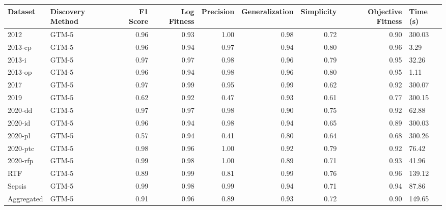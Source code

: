 \begin{tabular}{llrrrrrrl}
\toprule
Dataset & Discovery Method & F1 Score & Log Fitness & Precision & Generalization & Simplicity & Objective Fitness & Time (s) \\
\midrule
2012 & GTM-5 & 0.96 & 0.93 & 1.00 & 0.98 & 0.72 & 0.90 & 300.03 \\
2013-cp & GTM-5 & 0.96 & 0.94 & 0.97 & 0.94 & 0.80 & 0.96 & 3.29 \\
2013-i & GTM-5 & 0.97 & 0.97 & 0.98 & 0.96 & 0.79 & 0.95 & 32.26 \\
2013-op & GTM-5 & 0.96 & 0.94 & 0.98 & 0.96 & 0.80 & 0.95 & 1.11 \\
2017 & GTM-5 & 0.97 & 0.99 & 0.95 & 0.99 & 0.62 & 0.92 & 300.07 \\
2019 & GTM-5 & 0.62 & 0.92 & 0.47 & 0.93 & 0.61 & 0.77 & 300.15 \\
2020-dd & GTM-5 & 0.97 & 0.97 & 0.98 & 0.90 & 0.75 & 0.92 & 62.88 \\
2020-id & GTM-5 & 0.96 & 0.94 & 0.98 & 0.94 & 0.65 & 0.89 & 300.03 \\
2020-pl & GTM-5 & 0.57 & 0.94 & 0.41 & 0.80 & 0.64 & 0.68 & 300.26 \\
2020-ptc & GTM-5 & 0.98 & 0.96 & 1.00 & 0.92 & 0.79 & 0.92 & 76.42 \\
2020-rfp & GTM-5 & 0.99 & 0.98 & 1.00 & 0.89 & 0.71 & 0.93 & 41.96 \\
RTF & GTM-5 & 0.89 & 0.99 & 0.81 & 0.99 & 0.76 & 0.96 & 139.12 \\
Sepsis & GTM-5 & 0.99 & 0.98 & 0.99 & 0.94 & 0.71 & 0.94 & 87.86 \\
Aggregated & GTM-5 & 0.91 & 0.96 & 0.89 & 0.93 & 0.72 & 0.90 & 149.65 \\
\bottomrule
\end{tabular}
